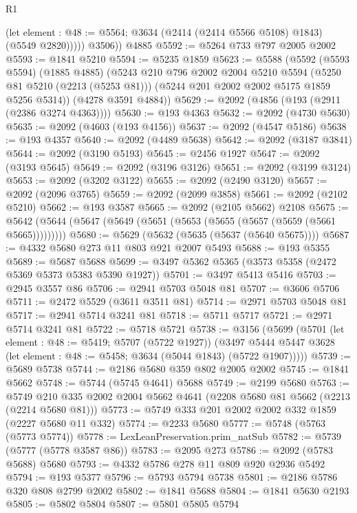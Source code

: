\begin{lexlean}{R1}
\begin{coremodule}
              (let element : @48 := @5564; @3634 (@2414 (@2414 @5566 @5108) @1843) (@5549 @2820)))))
        @3506))
    @4885
@5592 := @5264 @733 @797 @2005 @2002
@5593 := @1841 @5210
@5594 := @5235 @1859
@5623 := @5588
    (@5592
      (@5593 @5594)
      (@1885 @4885)
      (@5243
        @210
        @796
        @2002
        @2004
        @5210
        @5594
        (@5250 @81 @5210 (@2213 (@5253 @81)))
        (@5244 @201 @2002 @2002 @5175 @1859 @5256 @5314))
      (@4278 @3591 @4884))
@5629 := @2092 (@4856 (@193 (@2911 (@2386 @3274 @4363))))
@5630 := @193 @4363
@5632 := @2092 (@4730 @5630)
@5635 := @2092 (@4603 (@193 @4156))
@5637 := @2092 (@4547 @5186)
@5638 := @193 @4357
@5640 := @2092 (@4489 @5638)
@5642 := @2092 (@3187 @3841)
@5644 := @2092 (@3190 @5193)
@5645 := @2456 @1927
@5647 := @2092 (@3193 @5645)
@5649 := @2092 (@3196 @3126)
@5651 := @2092 (@3199 @3124)
@5653 := @2092 (@3202 @3122)
@5655 := @2092 (@2490 @3120)
@5657 := @2092 (@2096 @3765)
@5659 := @2092 (@2099 @3858)
@5661 := @2092 (@2102 @5210)
@5662 := @193 @3587
@5665 := @2092 (@2105 @5662) @2108
@5675 := @5642 (@5644 (@5647 (@5649 (@5651 (@5653 (@5655 (@5657 (@5659 (@5661 @5665)))))))))
@5680 := @5629 (@5632 (@5635 (@5637 (@5640 @5675))))
@5687 := @4332 @5680 @273 @11 @803 @921 @2007 @5493
@5688 := @193 @5355
@5689 := @5687 @5688
@5699 := @3497 @5362 @5365 (@3573 @5358 (@2472 @5369 @5373 @5383 @5390 @1927))
@5701 := @3497 @5413 @5416
@5703 := @2945 @3557 @86
@5706 := @2941 @5703 @5048 @81
@5707 := @3606 @5706
@5711 := @2472 @5529 (@3611 @3511 @81)
@5714 := @2971 @5703 @5048 @81
@5717 := @2941 @5714 @3241 @81
@5718 := @5711 @5717
@5721 := @2971 @5714 @3241 @81
@5722 := @5718 @5721
@5738 := @3156
    (@5699
      (@5701
        (let element : @48 := @5419; @5707 (@5722 @1927))
        (@3497 @5444 @5447 @3628 (let element : @48 := @5458; @3634 (@5044 @1843) (@5722 @1907)))))
@5739 := @5689 @5738
@5744 := @2186 @5680 @359 @802 @2005 @2002
@5745 := @1841 @5662
@5748 := @5744 (@5745 @4641) @5688
@5749 := @2199 @5680
@5763 := @5749 @210 @335 @2002 @2004 @5662 @4641 (@2208 @5680 @81 @5662 (@2213 (@2214 @5680 @81)))
@5773 := @5749 @333 @201 @2002 @2002 @332 @1859 (@2227 @5680 @11 @332)
@5774 := @2233 @5680
@5777 := @5748 (@5763 (@5773 @5774))
@5778 := LexLeanPreservation.prim_natSub
@5782 := @5739 (@5777 (@5778 @3587 @86))
@5783 := @2095 @273
@5786 := @2092 (@5783 @5688) @5680
@5793 := @4332 @5786 @278 @11 @809 @920 @2936 @5492
@5794 := @193 @5377
@5796 := @5793 @5794 @5738
@5801 := @2186 @5786 @320 @808 @2799 @2002
@5802 := @1841 @5688
@5804 := @1841 @5630 @2193
@5805 := @5802 @5804
@5807 := @5801 @5805 @5794

\end{coremodule}
\end{lexlean}
